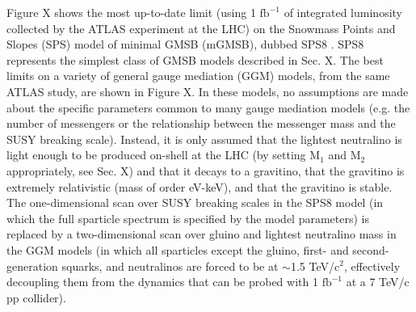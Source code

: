\documentclass[12pt, letterpaper]{report}
\begin{document}
Figure X shows the most up-to-date limit (using 1 $\mbox{fb}^{-1}$ of integrated luminosity collected by the ATLAS experiment \cite{ATLAS} at the LHC) on the Snowmass Points and Slopes (SPS) model of minimal GMSB (mGMSB), dubbed SPS8 \cite{SPS}.  SPS8 represents the simplest class of GMSB models described in Sec. X.  The best limits on a variety of general gauge mediation (GGM) models, from the same ATLAS study, are shown in Figure X.  In these models, no assumptions are made about the specific parameters common to many gauge mediation models (e.g. the number of messengers or the relationship between the messenger mass and the SUSY breaking scale).  Instead, it is only assumed that the lightest neutralino is light enough to be produced on-shell at the LHC (by setting $\mbox{M}_{1}$ and $\mbox{M}_{2}$ appropriately, see Sec. X) and that it decays to a gravitino, that the gravitino is extremely relativistic (mass of order eV-keV), and that the gravitino is stable.  The one-dimensional scan over SUSY breaking scales in the SPS8 model (in which the full sparticle spectrum is specified by the model parameters) is replaced by a two-dimensional scan over gluino and lightest neutralino mass in the GGM models (in which all sparticles except the gluino, first- and second-generation squarks, and neutralinos are forced to be at $\sim$1.5 TeV/$\mbox{c}^{2}$, effectively decoupling them from the dynamics that can be probed with 1 $\mbox{fb}^{-1}$ at a 7 TeV/c pp collider).  %
\end{document}
